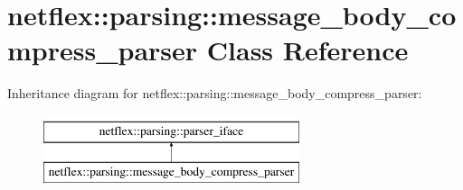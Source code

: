 \hypertarget{classnetflex_1_1parsing_1_1message__body__compress__parser}{}\section{netflex\+:\+:parsing\+:\+:message\+\_\+body\+\_\+compress\+\_\+parser Class Reference}
\label{classnetflex_1_1parsing_1_1message__body__compress__parser}
Inheritance diagram for netflex\+:\+:parsing\+:\+:message\+\_\+body\+\_\+compress\+\_\+parser\+:\begin{figure}[H]
\begin{center}
\leavevmode
\includegraphics[height=2.000000cm]{classnetflex_1_1parsing_1_1message__body__compress__parser}
\end{center}
\end{figure}
